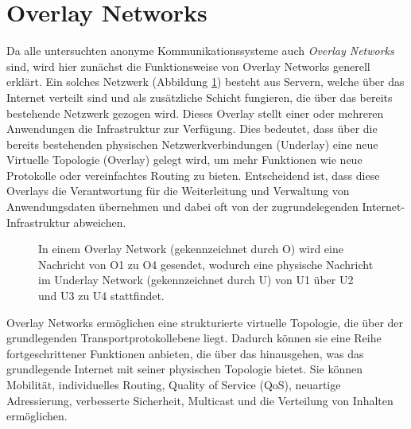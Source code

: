 \section{Overlay Networks}
\label{chap:overlay_networks}

Da alle untersuchten anonyme Kommunikationssysteme auch \textit{Overlay Networks} sind, wird hier zunächst die Funktionsweise von Overlay Networks generell erklärt.
Ein solches Netzwerk (Abbildung \ref{imgs:overlay_network}) besteht aus Servern, welche über das Internet verteilt sind und als zusätzliche Schicht fungieren, die über das bereits bestehende Netzwerk gezogen wird. Dieses Overlay stellt einer oder mehreren Anwendungen die Infrastruktur zur Verfügung. Dies bedeutet, dass über die bereits bestehenden physischen Netzwerkverbindungen (Underlay) eine neue Virtuelle Topologie (Overlay) gelegt wird, um mehr Funktionen wie neue Protokolle oder vereinfachtes Routing zu bieten. Entscheidend ist, dass diese Overlays die Verantwortung für die Weiterleitung und Verwaltung von Anwendungsdaten übernehmen und dabei oft von der zugrundelegenden Internet-Infrastruktur abweichen\cite{OverlayNetwork}.

\begin{figure}[h!]
    \centering
    
    \caption{In einem Overlay Network (gekennzeichnet durch O) wird eine Nachricht von O1 zu O4 gesendet, wodurch eine physische Nachricht im Underlay Network (gekennzeichnet durch U) von U1 über U2 und U3 zu U4 stattfindet.}
    \label{imgs:overlay_network}
\end{figure}

Overlay Networks ermöglichen eine strukturierte virtuelle Topologie, die über der grundlegenden Transportprotokollebene liegt. Dadurch können sie eine Reihe fortgeschrittener Funktionen anbieten, die über das hinausgehen, was das grundlegende Internet mit seiner physischen Topologie bietet. Sie können Mobilität, individuelles Routing, Quality of Service (QoS), neuartige Adressierung, verbesserte Sicherheit, Multicast und die Verteilung von Inhalten ermöglichen\cite{FutureOfTheInternet}.
